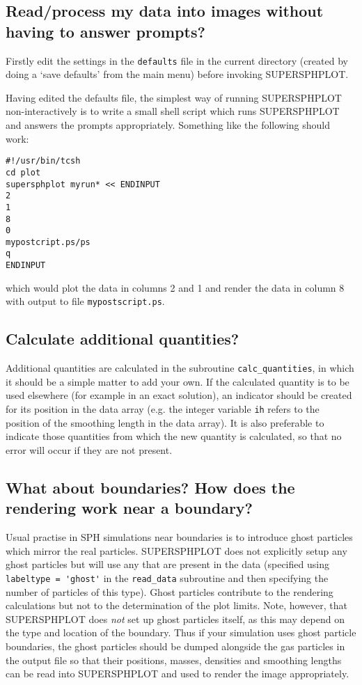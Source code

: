 \documentclass[a4paper,11pt]{article}
\begin{document}
\subsection{Read/process my data into images without having to answer prompts?}
 Firstly edit the settings in the \verb+defaults+ file in the current
directory (created by doing a `save defaults' from the main menu) before invoking SUPERSPHPLOT.

 Having edited the defaults file, the simplest way of running SUPERSPHPLOT
non-interactively is to write a small shell script which runs SUPERSPHPLOT
and answers the prompts appropriately. Something like the following should work:
\begin{verbatim}
#!/usr/bin/tcsh
cd plot
supersphplot myrun* << ENDINPUT
2
1
8
0
mypostcript.ps/ps
q
ENDINPUT
\end{verbatim}
which would plot the data in columns 2 and 1 and render the data in column 8 with
output to file \verb+mypostscript.ps+.

\subsection{Calculate additional quantities?}
 Additional quantities are calculated in the subroutine \verb+calc_quantities+,
in which it should be a simple matter to add your own.
If the calculated quantity is to be used elsewhere (for example in an exact
solution), an indicator should be created for its position in the data array
(e.g. the integer variable \verb+ih+ refers to the position of the smoothing
length in the data array). It is also preferable to indicate those quantities
from which the new quantity is calculated, so that no error will occur if they
are not present.

\subsection{What about boundaries? How does the rendering work near a boundary?}
 Usual practise in SPH simulations near boundaries is
to introduce ghost particles which mirror the real particles. SUPERSPHPLOT does not
explicitly setup any ghost particles but will use any that are present in the data
(specified using \verb+labeltype = 'ghost'+ in the \verb+read_data+ subroutine and
then specifying the number of particles of this type). Ghost particles contribute
to the rendering calculations but not to the determination of the plot limits. Note,
however, that SUPERSPHPLOT does \emph{not} set up ghost particles itself, as this may depend
on the type and location of the boundary. Thus if your simulation uses ghost particle
boundaries, the ghost particles should be dumped alongside the gas particles in the
output file so that their positions, masses, densities and smoothing lengths can be
read into SUPERSPHPLOT and used to render the image appropriately.
\end{document}
